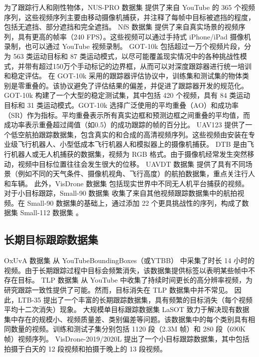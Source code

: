 为了跟踪行人和刚性物体，NUS-PRO 数据集 \cite{NUS} 提供了来自 YouTube 的 365 个视频序列，这些视频序列主要由移动摄像机捕获，并注释了每帧中目标被遮挡的程度，包括无遮挡、部分遮挡和完全遮挡。
NfS 数据集 \cite{Nfs} 提供了来自真实场景的视频序列，具有更高的帧率（240 FPS）。这些视频可以通过手持式 iPhone/iPad 摄像机录制，也可以通过 YouTube 视频录制。
GOT-10k \cite{GOT-10k} 包括超过一万个视频片段，分为 563 类运动目标和 87 类运动模式，以尽可能覆盖现实情况中的各种挑战性模式，并带有超过150万个手动标记的边界框，从而可以对深度跟踪器进行统一培训和稳定评估。
在 GOT-10k 采用的跟踪器评估协议中，训练集和测试集的物体类别是零重叠的。该协议避免了评估结果的偏差，并促进了跟踪器开发的规范化。
GOT-10k 构建了一个大型的稳定测试集，其中包括 420 个视频，具有 84 类运动目标和 31 类运动模式。GOT-10k 选择广泛使用的平均重叠（AO）和成功率（SR）作为指标。平均重叠表示所有真实边框和预测边框之间重叠的平均值，而成功率表示重叠超过阈值（如0.5）的成功跟踪的帧的百分比。
UAV123 \cite{mueller2016benchmark} 提供了一个低空航拍跟踪数据集，包含真实的和合成的高清视频序列。这些视频由安装在专业级飞行机器人、小型低成本飞行机器人和模拟器上的摄像机捕获。
DTB \cite{DTB} 是由飞行机器人或无人机捕获的数据集，视频为 RGB 格式。由于摄像机经常发生突然移动，视频中目标位置往往会发生很大的位移。
UAVDT 数据集 \cite{UAVDT} 提供了具有不同场景（例如不同的天气条件、摄像机视角、飞行高度）的航拍数据集，重点关注行人和车辆。
此外，VisDrone 数据集 \cite{VisDrone} 包括现实世界中不同无人机平台捕获的视频。对于小目标跟踪，Small-90 数据集 \cite{Small} 收集了来自其他视频跟踪数据集中的航拍视频。在 Small-90 数据集的基础上，通过添加 22 个更具挑战性的序列，构成了数据集 Small-112 数据集 \cite{Small}。 
\subsection{长期目标跟踪数据集}
OxUvA 数据集 \cite{OxUvA} 从 YouTubeBoundingBoxes（或YTBB）\cite{YTBB} 中采集了时长 14 小时的视频。由于长期跟踪过程中目标会频繁消失，该数据集提供标签以表明某些帧中不存在目标。
TLP 数据集 \cite{TLP} 从 YouTube 中收集了持续时间更长的高分辨率视频，为研究跟踪一致性提供了可能。然而，目标消失在 TLP 数据集中并不常见。
因此，LTB-35 \cite{LTB} 提出了一个丰富的长期跟踪数据集，具有频繁的目标消失（每个视频平均十二次消失）现象。
大规模单目标跟踪数据集 LaSOT \cite{LaSOT} 致力于解决现有数据集中存在的规模小、视频质量差、类别偏差等问题。该数据集中的每个类别具有相同数量的视频。训练和测试子集分别包括 1120 段（2.3M 帧）和 280 段（690K 帧）视频序列。
VisDrone-2019/2020L \cite{VisDrone} 提出了一个小目标跟踪数据集，其中包括拍摄于白天的 12 段视频和拍摄于晚上的 13 段视频。%


